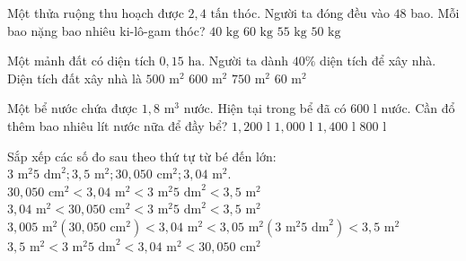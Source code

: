 \begin{ex} %
Một thửa ruộng thu hoạch được $2{,}4\text{ tấn}$ thóc. Người ta đóng đều vào $48$ bao. Mỗi bao nặng bao nhiêu ki-lô-gam thóc?
\choice
{$40\text{ kg}$}
{$60\text{ kg}$}
{$55\text{ kg}$}
{\True $50\text{ kg}$}
\end{ex}

\begin{ex} %
Một mảnh đất có diện tích $0{,}15\text{ ha}$. Người ta dành $40\%$ diện tích để xây nhà. Diện tích đất xây nhà là
\choice
{$500\text{ m}^2$}
{\True $600\text{ m}^2$}
{$750\text{ m}^2$}
{$60\text{ m}^2$}
\end{ex}

\begin{ex} %
Một bể nước chứa được $1{,}8\text{ m}^3$ nước. Hiện tại trong bể đã có $600\text{ l}$ nước. Cần đổ thêm bao nhiêu lít nước nữa để đầy bể?
\choice
{\True $1,200\text{ l}$}
{$1,000\text{ l}$}
{$1,400\text{ l}$}
{$800\text{ l}$}
\end{ex}

\begin{ex} %
Sắp xếp các số đo sau theo thứ tự từ bé đến lớn: $3\text{ m}^2 5\text{ dm}^2; 3{,}5\text{ m}^2; 30,050\text{ cm}^2; 3{,}04\text{ m}^2$.
\choice
{$30,050\text{ cm}^2 < 3{,}04\text{ m}^2 < 3\text{ m}^2 5\text{ dm}^2 < 3{,}5\text{ m}^2$}
{$3{,}04\text{ m}^2 < 30,050\text{ cm}^2 < 3\text{ m}^2 5\text{ dm}^2 < 3{,}5\text{ m}^2$}
{\True $3{,}005\text{ m}^2 (30,050\text{ cm}^2) < 3{,}04\text{ m}^2 < 3{,}05\text{ m}^2 (3\text{ m}^2 5\text{ dm}^2) < 3{,}5\text{ m}^2$}
{$3{,}5\text{ m}^2 < 3\text{ m}^2 5\text{ dm}^2 < 3{,}04\text{ m}^2 < 30,050\text{ cm}^2$}
\end{ex}

